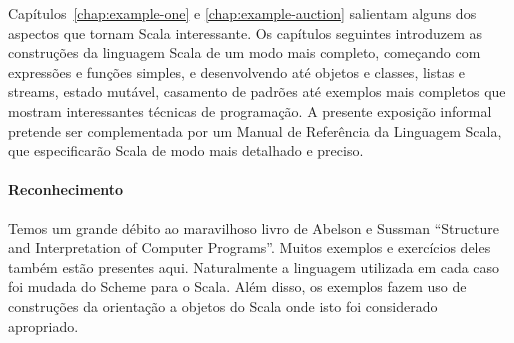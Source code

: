 \documentclass[a4paper,12pt,twoside,titlepage]{book}
\begin{document}

Capítulos~\ref{chap:example-one} e \ref{chap:example-auction}
salientam alguns dos aspectos que tornam Scala interessante. Os
capítulos seguintes introduzem as construções da linguagem Scala de um
modo mais completo, começando com expressões e funções simples, e 
desenvolvendo até objetos e classes, listas e streams, estado 
mutável, casamento de padrões até exemplos mais completos que mostram
interessantes técnicas de programação. A presente exposição informal
pretende ser complementada por um Manual de Referência da Linguagem Scala, que
especificarão Scala de modo mais detalhado e preciso. 

\paragraph{Reconhecimento}

Temos um grande débito ao maravilhoso livro de Abelson e Sussman
``Structure and Interpretation of Computer
Programs''\cite{abelson-sussman:structure}. Muitos exemplos e exercícios 
deles também estão presentes aqui. Naturalmente a linguagem utilizada em
cada caso foi mudada do Scheme para o Scala. Além disso, os exemplos
fazem uso de construções da orientação a objetos do Scala onde isto foi
considerado apropriado. 




\end{document}
